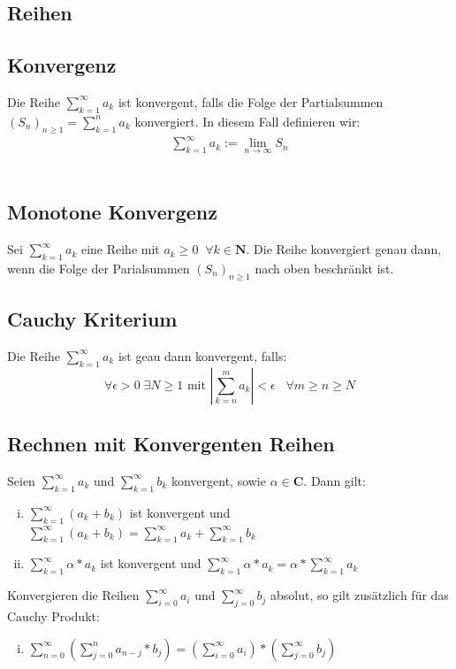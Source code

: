 \documentclass[8pt]{article}
\begin{document}
\begin{multicols*}{3}
\section{Reihen}
\hypertarget{sec:1}{}
  \subsection{Konvergenz}
Die Reihe $\sum_{k = 1}^{\infty} a_k$ ist konvergent, falls die Folge der
Partialsummen $(S_n)_{n \geq 1} = \sum_{k = 1}^{n} a_k$
konvergiert. In diesem Fall definieren wir:
\begin{align*}
  \sum_{k = 1}^{\infty} a_k := \lim_{n \rightarrow \infty} S_n
\end{align*}\\
  \subsection {Monotone Konvergenz}
Sei $\sum_{k = 1}^\infty a_k$ eine Reihe mit $a_k \geq 0 \;\; \forall k \in \mathbf{N}$.
Die Reihe konvergiert genau dann, wenn die Folge der Parialsummen $(S_n)_{n \geq 1}$ nach
oben beschränkt ist.
\subsection{Cauchy Kriterium}
Die Reihe $\sum_{k = 1}^{\infty} a_k$ ist geau dann konvergent, falls:
$$
  \forall \epsilon > 0 \; \exists N \geq 1 \text{ mit } \left| \sum_{k = n}^m a_k \right| < \epsilon \; \; \; \forall m \geq n \geq N
$$
\subsection{Rechnen mit Konvergenten Reihen}
Seien $\sum_{k = 1}^\infty a_k$ und $\sum_{k = 1}^\infty b_k$ konvergent, sowie $\alpha \in \mathbf{C}$.
Dann gilt:
\begin{enumerate}[(i)]
  \item $\sum_{k = 1}^\infty (a_k + b_k)$ ist konvergent und $\sum_{k = 1}^\infty (a_k + b_k) = \sum_{k = 1}^\infty a_k + \sum_{k = 1}^\infty b_k$
  \item $\sum_{k = 1}^\infty \alpha * a_k$ ist konvergent und $\sum_{k = 1}^\infty \alpha * a_k = \alpha * \sum_{k = 1}^\infty a_k$
\end{enumerate}
Konvergieren die Reihen $\sum_{i = 0}^\infty a_i$ und $\sum_{j = 0}^\infty b_j$ absolut,
so gilt zusätzlich für das Cauchy Produkt:
\begin{enumerate}[(iii)]
  \item $\sum_{n = 0}^\infty (\sum_{j = 0}^n a_{n - j} * b_j) = (\sum_{i = 0}^\infty a_i) * (\sum_{j = 0}^\infty b_j)$
\end{enumerate}

\end{multicols*}
\end{document}
